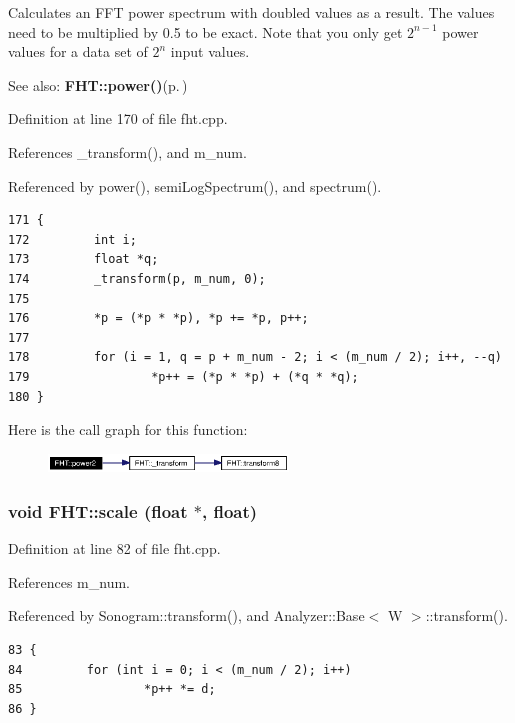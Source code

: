 Calculates an FFT power spectrum with doubled values as a result. The values need to be multiplied by 0.5 to be exact. Note that you only get $2^{n-1}$ power values for a data set of $2^n$ input values. \begin{Desc}
\item[See also:]{\bf FHT::power()}{\rm (p.\,\pageref{classFHT_FHTa12})}\end{Desc}


Definition at line 170 of file fht.cpp.

References \_\-transform(), and m\_\-num.

Referenced by power(), semi\-Log\-Spectrum(), and spectrum().



\footnotesize\begin{verbatim}171 {
172         int i;
173         float *q;
174         _transform(p, m_num, 0);
175 
176         *p = (*p * *p), *p += *p, p++;
177 
178         for (i = 1, q = p + m_num - 2; i < (m_num / 2); i++, --q)
179                 *p++ = (*p * *p) + (*q * *q);
180 }
\end{verbatim}\normalsize 


Here is the call graph for this function:\begin{figure}[H]
\begin{center}
\leavevmode
\includegraphics[width=181pt]{classFHT_FHTa13_cgraph}
\end{center}
\end{figure}
\subsubsection{\setlength{\rightskip}{0pt plus 5cm}void FHT::scale (float $\ast$, float)}\label{classFHT_FHTa6}




Definition at line 82 of file fht.cpp.

References m\_\-num.

Referenced by Sonogram::transform(), and Analyzer::Base$<$ W $>$::transform().



\footnotesize\begin{verbatim}83 {
84         for (int i = 0; i < (m_num / 2); i++)
85                 *p++ *= d;
86 }
\end{verbatim}\normalsize 
{}
